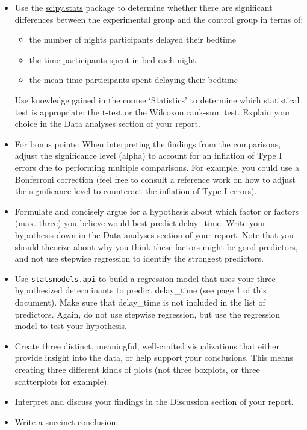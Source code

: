 \documentclass[a4paper]{report}
\theoremstyle{definition}
\begin{document}
\begin{itemize}
\item Use the
\href{http://docs.scipy.org/doc/scipy/reference/stats.html}{scipy.stats}
package to determine whether there are significant differences between
the experimental group and the control group in terms of:
	\begin{itemize}
	\item the number of nights participants delayed their bedtime
	\item the time participants spent in bed each night
	\item the mean time participants spent delaying their bedtime
	\end{itemize}
Use knowledge gained in the course `Statistics' to determine
which statistical test is appropriate: the t-test or the Wilcoxon
rank-sum test. Explain your choice in the Data analyses section of
your report.

\item For bonus points: When interpreting the findings from the
comparisons, adjust the significance level (alpha) to account for an
inflation of Type I errors due to performing multiple comparisons. For
example, you could use a Bonferroni correction (feel free to consult a
reference work on how to adjust the significance level to counteract
the inflation of Type I errors).

\item Formulate and concisely argue for a hypothesis about which factor
or factors (max. three) you believe would best predict delay\_time. Write
your hypothesis down in the Data analyses section of your report. Note
that you should theorize about why you think these factors might be good
predictors, and not use stepwise regression to identify the strongest
predictors.

\item Use \texttt{\small statsmodels.api} to build a regression model
that uses your three hypothesized determinants to predict delay\_time
(see page 1 of this document). Make sure that delay\_time is not included
in the list of predictors. Again, do not use stepwise regression, but
use the regression model to test your hypothesis.

\item Create three distinct, meaningful, well-crafted visualizations
that either provide insight into the data, or help support your
conclusions. This means creating three different kinds of plots (not
three boxplots, or three scatterplots for example).

\item Interpret and discuss your findings in the Discussion section of
your report.

\item Write a succinct conclusion.
\end{itemize}
\end{document}
